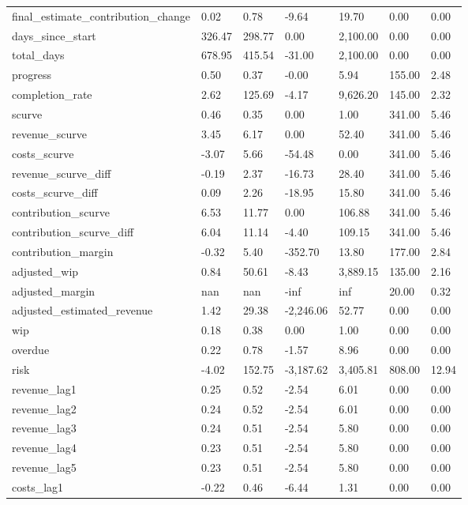 \begin{landscape}
\begin{longtable}[h!]{lllllll}
final_estimate_contribution_change & 0.02 & 0.78 & -9.64 & 19.70 & 0.00 & 0.00 \\
days_since_start & 326.47 & 298.77 & 0.00 & 2,100.00 & 0.00 & 0.00 \\
total_days & 678.95 & 415.54 & -31.00 & 2,100.00 & 0.00 & 0.00 \\
progress & 0.50 & 0.37 & -0.00 & 5.94 & 155.00 & 2.48 \\
completion_rate & 2.62 & 125.69 & -4.17 & 9,626.20 & 145.00 & 2.32 \\
scurve & 0.46 & 0.35 & 0.00 & 1.00 & 341.00 & 5.46 \\
revenue_scurve & 3.45 & 6.17 & 0.00 & 52.40 & 341.00 & 5.46 \\
costs_scurve & -3.07 & 5.66 & -54.48 & 0.00 & 341.00 & 5.46 \\
revenue_scurve_diff & -0.19 & 2.37 & -16.73 & 28.40 & 341.00 & 5.46 \\
costs_scurve_diff & 0.09 & 2.26 & -18.95 & 15.80 & 341.00 & 5.46 \\
contribution_scurve & 6.53 & 11.77 & 0.00 & 106.88 & 341.00 & 5.46 \\
contribution_scurve_diff & 6.04 & 11.14 & -4.40 & 109.15 & 341.00 & 5.46 \\
contribution_margin & -0.32 & 5.40 & -352.70 & 13.80 & 177.00 & 2.84 \\
adjusted_wip & 0.84 & 50.61 & -8.43 & 3,889.15 & 135.00 & 2.16 \\
adjusted_margin & nan & nan & -inf & inf & 20.00 & 0.32 \\
adjusted_estimated_revenue & 1.42 & 29.38 & -2,246.06 & 52.77 & 0.00 & 0.00 \\
wip & 0.18 & 0.38 & 0.00 & 1.00 & 0.00 & 0.00 \\
overdue & 0.22 & 0.78 & -1.57 & 8.96 & 0.00 & 0.00 \\
risk & -4.02 & 152.75 & -3,187.62 & 3,405.81 & 808.00 & 12.94 \\
revenue_lag1 & 0.25 & 0.52 & -2.54 & 6.01 & 0.00 & 0.00 \\
revenue_lag2 & 0.24 & 0.52 & -2.54 & 6.01 & 0.00 & 0.00 \\
revenue_lag3 & 0.24 & 0.51 & -2.54 & 5.80 & 0.00 & 0.00 \\
revenue_lag4 & 0.23 & 0.51 & -2.54 & 5.80 & 0.00 & 0.00 \\
revenue_lag5 & 0.23 & 0.51 & -2.54 & 5.80 & 0.00 & 0.00 \\
costs_lag1 & -0.22 & 0.46 & -6.44 & 1.31 & 0.00 & 0.00 \\

\end{longtable}
\end{landscape}
